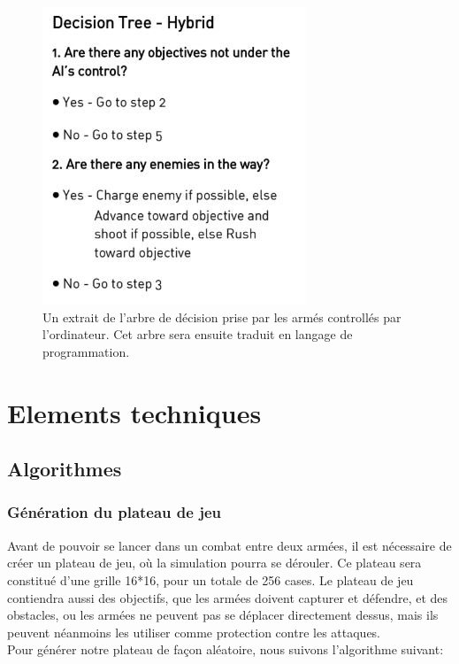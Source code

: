 \documentclass[a4paper, 11pt]{article}
\begin{document}
\begin{figure}[h]

	\centering
	\includegraphics[scale=0.6]{treepreview}
	\caption{Un extrait de l'arbre de décision prise par les armés controllés par l'ordinateur. Cet arbre sera ensuite traduit en langage de programmation.}

\end{figure}

\newpage

\section{Elements techniques}

\subsection{Algorithmes}

\subsubsection{Génération du plateau de jeu}

Avant de pouvoir se lancer dans un combat entre deux armées, il est nécessaire de créer un plateau de jeu, où la simulation pourra se dérouler. Ce plateau sera constitué d'une grille 16*16, pour un totale de 256 cases. Le plateau de jeu contiendra aussi des objectifs, que les armées doivent capturer et défendre, et des obstacles, ou les armées ne peuvent pas se déplacer directement dessus, mais ils peuvent néanmoins les utiliser comme protection contre les attaques. \\

Pour générer notre plateau de façon aléatoire, nous suivons l'algorithme suivant:
\end{document}

